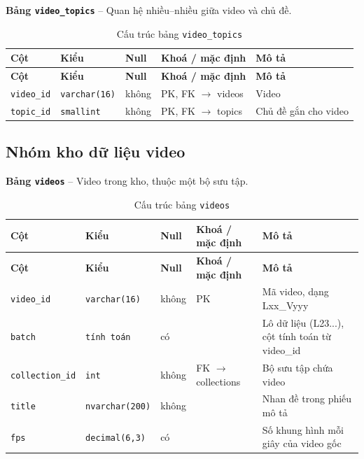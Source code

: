 \textbf{Bảng \texttt{video\_topics}} -- Quan hệ nhiều--nhiều giữa video và chủ đề.

\setlength{\tabcolsep}{4pt}
\begin{longtable}{>{\raggedright\arraybackslash}p{}>{\raggedright\arraybackslash}p{}>{\centering\arraybackslash}p{}>{\raggedright\arraybackslash}p{}>{\raggedright\arraybackslash}p{}}
\caption{Cấu trúc bảng \texttt{video\_topics}}\label{tab:col_video_topics}\\
\toprule \textbf{Cột} & \textbf{Kiểu} & \textbf{Null} & \textbf{Khoá / mặc định} & \textbf{Mô tả} \\ \midrule \endfirsthead
\toprule \textbf{Cột} & \textbf{Kiểu} & \textbf{Null} & \textbf{Khoá / mặc định} & \textbf{Mô tả} \\ \midrule \endhead
\bottomrule \endfoot
\texttt{video\_id} & {\footnotesize\texttt{varchar(16)}} & không & PK, FK $\rightarrow$ videos & Video \\
\texttt{topic\_id} & {\footnotesize\texttt{smallint}} & không & PK, FK $\rightarrow$ topics & Chủ đề gắn cho video \\
\end{longtable}

\subsection{Nhóm kho dữ liệu video}

\textbf{Bảng \texttt{videos}} -- Video trong kho, thuộc một bộ sưu tập.

\setlength{\tabcolsep}{4pt}
\begin{longtable}{>{\raggedright\arraybackslash}p{}>{\raggedright\arraybackslash}p{}>{\centering\arraybackslash}p{}>{\raggedright\arraybackslash}p{}>{\raggedright\arraybackslash}p{}}
\caption{Cấu trúc bảng \texttt{videos}}\label{tab:col_videos}\\
\toprule \textbf{Cột} & \textbf{Kiểu} & \textbf{Null} & \textbf{Khoá / mặc định} & \textbf{Mô tả} \\ \midrule \endfirsthead
\toprule \textbf{Cột} & \textbf{Kiểu} & \textbf{Null} & \textbf{Khoá / mặc định} & \textbf{Mô tả} \\ \midrule \endhead
\bottomrule \endfoot
\texttt{video\_id} & {\footnotesize\texttt{varchar(16)}} & không & PK & Mã video, dạng Lxx\_Vyyy \\
\texttt{batch} & {\footnotesize\texttt{tính toán}} & có &  & Lô dữ liệu (L23...), cột tính toán từ video\_id \\
\texttt{collection\_id} & {\footnotesize\texttt{int}} & không & FK $\rightarrow$ collections & Bộ sưu tập chứa video \\
\texttt{title} & {\footnotesize\texttt{nvarchar(200)}} & không &  & Nhan đề trong phiếu mô tả \\
\texttt{fps} & {\footnotesize\texttt{decimal(6,3)}} & có &  & Số khung hình mỗi giây của video gốc \\
\end{longtable}

